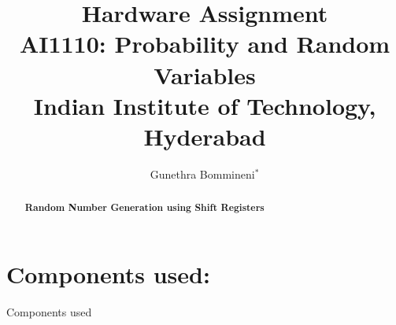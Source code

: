 \documentclass[journal,12pt,twocolumn]{IEEEtran}
\begin{document}
\let\vec\mathbf

\vspace{3cm}

\title{
\textbf {Hardware Assignment}\\ \large \textbf{AI1110}: Probability and Random Variables\\Indian Institute of Technology, Hyderabad
}
\author{Gunethra Bommineni$^{*}$%
  }

\maketitle

\newpage

\bigskip
\renewcommand{\thefigure}{\theenumi}
\renewcommand{\thetable}{\theenumi}

\begin{abstract}
    \textbf{Random Number Generation using Shift Registers}
\end{abstract}


\section*{Components used:}
\begin{table}[h]
	
	\caption{Components used}
\end{table}
\end{document}
